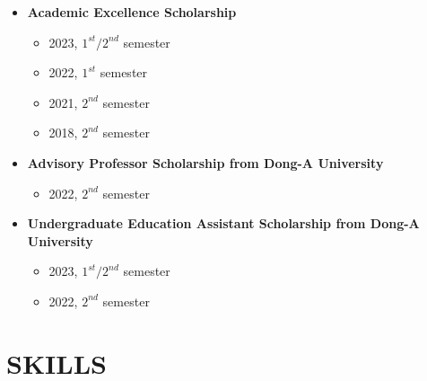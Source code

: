 \documentclass[a4paper,9pt]{extarticle}
\begin{document}
\begin{itemize}
    \item \textbf{Academic Excellence Scholarship}
    \begin{itemize}
        \item 2023, $1^{st} / 2^{nd}$ semester 
        \item 2022, $1^{st}$ semester 
        \item 2021, $2^{nd}$ semester 
        \item 2018, $2^{nd}$ semester 
    \end{itemize} 
    \item \textbf{Advisory Professor Scholarship from Dong-A University}
    \begin{itemize}
        \item 2022, $2^{nd}$ semester 
    \end{itemize} 
    \item \textbf{Undergraduate Education Assistant Scholarship from Dong-A University}
    \begin{itemize}
        \item 2023, $1^{st}/2^{nd}$ semester 
        \item 2022, $2^{nd}$ semester \\
    \end{itemize} 
\end{itemize}

\section*{SKILLS}
\end{document}

